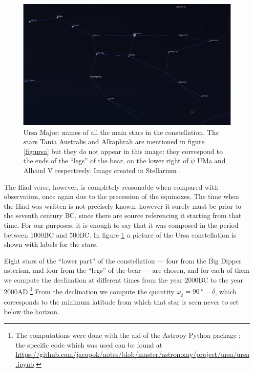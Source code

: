 \documentclass[main.tex]{subfiles}
\begin{document}
\begin{figure}[ht]
\centering
\includegraphics[width=\textwidth]{figures/ursa_names.png}
\caption{Ursa Major: names of all the main stars in the constellation. The stars Tania Australis and Alkaphrah are mentioned in figure \ref{fig:ursa} but they do not appear in this image: they correspond to the ends of the ``legs'' of the bear, on the lower right of \(\psi \) UMa and Alhaud V respectively. Image created in Stellarium \cite[]{stellariumcontributorsStellariumAstronomySoftware2020}.}
\label{fig:ursa-names}
\end{figure}

The Iliad verse, however, is completely reasonable when compared with observation, once again due to the precession of the equinoxes. 
The time when the Iliad was written is not precisely known, however it surely must be prior to the seventh century BC, since there are source referencing it starting from that time.
For our purposes, it is enough to say that it was composed in the period between 1000BC and 500BC.
In figure \ref{fig:ursa-names} a picture of the Ursa constellation is shown with labels for the stars.

Eight stars of the ``lower part'' of the constellation --- four from the Big Dipper asterism, and four from the ``legs'' of the bear --- are chosen, and for each of them we compute the declination at different times from the year 2000BC to the year 2000AD.\footnote{The computations were done with the aid of the Astropy Python package \cite[]{astropycollaborationAstropyProjectBuilding2018}; the specific code which was used can be found at \url{https://github.com/jacopok/notes/blob/master/astronomy/project/ursa/ursa.ipynb}.}
From the declination we compute the quantity \(\varphi _\delta  = \SI{90}{\degree} - \delta \), which corresponds to the minimum latitude from which that star is seen never to set below the horizon. 
\end{document}
